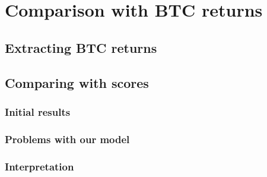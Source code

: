 \documentclass[
  a4paper]{article}
\begin{document}
\hypertarget{comparison-with-btc-returns}{%
\section{Comparison with BTC
returns}\label{comparison-with-btc-returns}}

\hypertarget{extracting-btc-returns}{%
\subsection{Extracting BTC returns}\label{extracting-btc-returns}}

\hypertarget{comparing-with-scores}{%
\subsection{Comparing with scores}\label{comparing-with-scores}}

\hypertarget{initial-results}{%
\subsubsection{Initial results}\label{initial-results}}

\hypertarget{problems-with-our-model}{%
\subsubsection{Problems with our model}\label{problems-with-our-model}}

\hypertarget{interpretation}{%
\subsubsection{Interpretation}\label{interpretation}}


\printbibliography[title=Conclusion]
\end{document}
